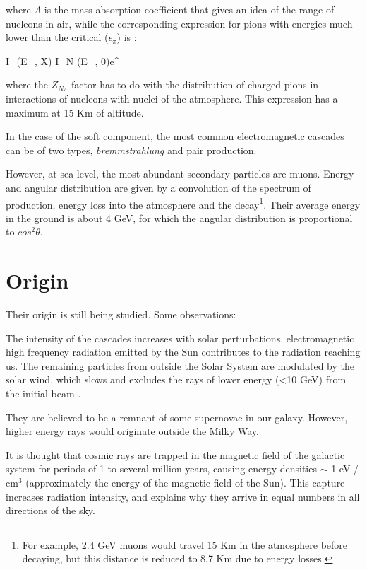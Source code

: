 where $\Lambda$ is the mass absorption coefficient that gives an idea of ​​the range of nucleons in air, while the corresponding expression for pions with energies much lower than the critical ($\epsilon_\pi$) is \cite{eid:04}:

	\be\label{eq:ipi} I_\pi(E_\pi, X) \approx {}I_N (E_\pi, 0)e^{}\ee


where the $Z_{N\pi}$ factor has to do with the distribution of charged pions in interactions of nucleons with nuclei of the atmosphere. This expression has a maximum at 15 Km of altitude.

In the case of the soft component, the most common electromagnetic cascades can be of two types, \textit{bremmstrahlung} and pair production.

However, at sea level, the most abundant secondary particles are muons. Energy and angular distribution are given by a convolution of the spectrum of production, energy loss into the atmosphere and the decay\footnote{For example, 2.4 GeV muons would travel 15 Km in the atmosphere before decaying, but this distance is reduced to 8.7 Km due to energy losses.}. Their average energy in the ground is about 4 GeV, for which the angular distribution is proportional to $cos^2\theta$.



	\section{Origin}

	Their origin is still being studied. Some observations:

	\bi
		\item The intensity of the cascades increases with solar perturbations, electromagnetic high frequency radiation emitted by the Sun contributes to the radiation reaching us. The remaining particles from outside the Solar System are modulated by the solar wind, which slows and excludes the rays of lower energy (<10 GeV) from the initial beam \cite{eid:04}.

		\item They are believed to be a remnant of some supernovae in our galaxy. However, higher energy rays would originate outside the Milky Way.

		\item It is thought that cosmic rays are trapped in the magnetic field of the galactic system for periods of 1 to several million years, causing energy densities $\sim$ 1 eV / cm$^3$ (approximately the energy of the magnetic field of the Sun). This capture increases radiation intensity, and explains why they arrive in equal numbers in all directions of the sky.

